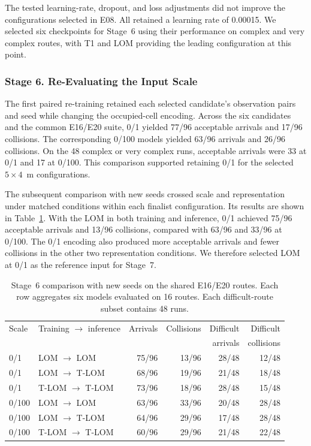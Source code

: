 \documentclass[robotics,article,submit,pdftex,moreauthors]{Definitions/mdpi}
\begin{document}
The tested learning-rate, dropout, and loss adjustments did not improve the configurations selected in E08. All retained a learning rate of 0.00015. We selected six checkpoints for Stage~6 using their performance on complex and very complex routes, with T1 and LOM providing the leading configuration at this point.

\subsubsection{Stage 6. Re-Evaluating the Input Scale}\label{subsec:stage6_results}

The first paired re-training retained each selected candidate's observation pairs and seed while changing the occupied-cell encoding. Across the six candidates and the common E16/E20 suite, 0/1 yielded 77/96 acceptable arrivals and 17/96 collisions. The corresponding 0/100 models yielded 63/96 arrivals and 26/96 collisions. On the 48 complex or very complex runs, acceptable arrivals were 33 at 0/1 and 17 at 0/100. This comparison supported retaining 0/1 for the selected $5\times4$~m configurations.

The subsequent comparison with new seeds crossed scale and representation under matched conditions within each finalist configuration. Its results are shown in Table~\ref{tab:stage6_encoding}. With the LOM in both training and inference, 0/1 achieved 75/96 acceptable arrivals and 13/96 collisions, compared with 63/96 and 33/96 at 0/100. The 0/1 encoding also produced more acceptable arrivals and fewer collisions in the other two representation conditions. We therefore selected LOM at 0/1 as the reference input for Stage~7.

\begin{table}[htbp]
\color{red}
\centering
\caption{Stage~6 comparison with new seeds on the shared E16/E20 routes. Each row aggregates six models evaluated on 16 routes. Each difficult-route subset contains 48 runs.}
\label{tab:stage6_encoding}
\small
\begin{tabular}{llrrrr}
\toprule
Scale & Training $\rightarrow$ inference & Arrivals & Collisions & Difficult & Difficult \\
      & & & & arrivals & collisions \\
\midrule
0/1 & LOM $\rightarrow$ LOM & 75/96 & 13/96 & 28/48 & 12/48 \\
0/1 & LOM $\rightarrow$ T-LOM & 68/96 & 19/96 & 21/48 & 18/48 \\
0/1 & T-LOM $\rightarrow$ T-LOM & 73/96 & 18/96 & 28/48 & 15/48 \\
0/100 & LOM $\rightarrow$ LOM & 63/96 & 33/96 & 20/48 & 28/48 \\
0/100 & LOM $\rightarrow$ T-LOM & 64/96 & 29/96 & 17/48 & 28/48 \\
0/100 & T-LOM $\rightarrow$ T-LOM & 60/96 & 29/96 & 21/48 & 22/48 \\
\bottomrule
\end{tabular}
\end{table}
\end{document}
